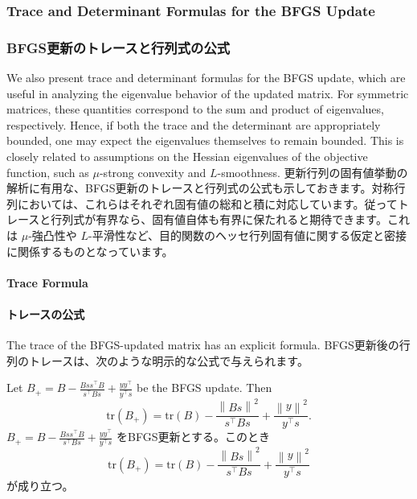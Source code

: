 \documentclass[0_main]{subfiles}
\begin{document}
\ifEn
    \subsubsection{Trace and Determinant Formulas for the BFGS Update}
\else
    \subsubsection{BFGS更新のトレースと行列式の公式}
\fi

\ifEn
    We also present trace and determinant formulas for the BFGS update, which are useful in analyzing the eigenvalue behavior of the updated matrix. For symmetric matrices, these quantities correspond to the sum and product of eigenvalues, respectively. Hence, if both the trace and the determinant are appropriately bounded, one may expect the eigenvalues themselves to remain bounded. This is closely related to assumptions on the Hessian eigenvalues of the objective function, such as $\mu$-strong convexity and $L$-smoothness.
\else
    更新行列の固有値挙動の解析に有用な、BFGS更新のトレースと行列式の公式も示しておきます。対称行列においては、これらはそれぞれ固有値の総和と積に対応しています。従ってトレースと行列式が有界なら、固有値自体も有界に保たれると期待できます。これは $\mu$-強凸性や $L$-平滑性など、目的関数のヘッセ行列固有値に関する仮定と密接に関係するものとなっています。
\fi

\ifEn
    \paragraph{Trace Formula}
\else
    \paragraph{トレースの公式}
\fi

\ifEn
    The trace of the BFGS-updated matrix has an explicit formula.
\else
    BFGS更新後の行列のトレースは、次のような明示的な公式で与えられます。
\fi

\begin{proposition}\label{prop:bfgs-trace}
    \ifEn
        Let $B_{+} = B - \frac{Bss^\top B}{s^\top Bs} + \frac{yy^\top}{y^\top s}$ be the BFGS update. Then
        \begin{equation*}
            \mathrm{tr}(B_{+}) = \mathrm{tr}(B) - \frac{\left\lVert B s \right\rVert^2}{s^\top Bs} + \frac{\left\lVert y \right\rVert^2}{y^\top s}.
        \end{equation*}
    \else
        $B_{+} = B - \frac{Bss^\top B}{s^\top Bs} + \frac{yy^\top}{y^\top s}$ をBFGS更新とする。このとき
        \begin{equation*}
            \mathrm{tr}(B_{+}) = \mathrm{tr}(B) - \frac{\left\lVert B s \right\rVert^2}{s^\top Bs} + \frac{\left\lVert y \right\rVert^2}{y^\top s}
        \end{equation*}
        が成り立つ。
    \fi
\end{proposition}
\end{document}
